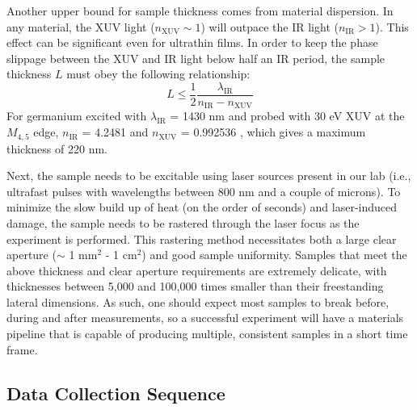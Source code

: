 Another upper bound for sample thickness comes from material dispersion. In any material, the XUV light ($n_{\text{XUV}} \sim 1$) will outpace the IR light ($n_{\text{IR}} > 1$). This effect can be significant even for ultrathin films. In order to keep the phase slippage between the XUV and IR light below half an IR period, the sample thickness $L$ must obey the following relationship:
\begin{equation}
L \le \frac{1}{2} \frac{\lambda_{\text{IR}}}{n_{\text{IR}} - n_{\text{XUV}}}
\end{equation}
For germanium excited with $\lambda_{\text{IR}}$ = 1430 nm and probed with 30 eV XUV at the $M_{4,5}$ edge, $n_{\text{IR}}$ = 4.2481 \cite{nunleyOpticalConstantsGermanium2016} and $n_{\text{XUV}}$ = 0.992536 \cite{gulliksonCXROXRayInteractions}, which gives a maximum thickness of 220 nm.

Next, the sample needs to be excitable using laser sources present in our lab (i.e., ultrafast pulses with wavelengths between 800 nm and a couple of microns). To minimize the slow build up of heat (on the order of seconds) and laser-induced damage, the sample needs to be rastered through the laser focus as the experiment is performed. This rastering method necessitates both a large clear aperture ($\sim$ 1 mm$^2$ - 1 cm$^2$) and good sample uniformity. Samples that meet the above thickness and clear aperture requirements are extremely delicate, with thicknesses between 5,000 and 100,000 times smaller than their freestanding lateral dimensions. As such, one should expect most samples to break before, during and after measurements, so a successful experiment will have a materials pipeline that is capable of producing multiple, consistent samples in a short time frame.

\subsection{Data Collection Sequence}

